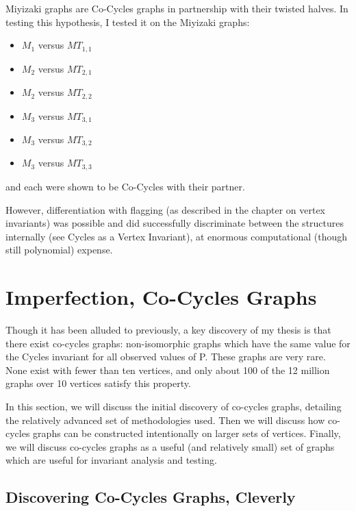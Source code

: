 Miyizaki graphs are Co-Cycles graphs in partnership with their twisted halves.
In testing this hypothesis, I tested it on the Miyizaki graphs:
\begin{itemize}
\item{$M_1$ versus $MT_{1,1}$}
\item{$M_2$ versus $MT_{2,1}$}
\item{$M_2$ versus $MT_{2,2}$}
\item{$M_3$ versus $MT_{3,1}$}
\item{$M_3$ versus $MT_{3,2}$}
\item{$M_3$ versus $MT_{3,3}$}
\end{itemize}
and each were shown to be Co-Cycles with their partner.

However, differentiation with flagging (as described in the chapter on vertex invariants) was possible and did successfully discriminate between the structures internally (see Cycles as a Vertex Invariant), at enormous computational (though still polynomial) expense.

\section{Imperfection, Co-Cycles Graphs}

Though it has been alluded to previously, a key discovery of my thesis is that there exist co-cycles graphs: non-isomorphic graphs which have the same value for the Cycles invariant for all observed values of P.
These graphs are very rare.
None exist with fewer than ten vertices, and only about 100 of the 12 million graphs over 10 vertices satisfy this property.

In this section, we will discuss the initial discovery of co-cycles graphs, detailing the relatively advanced set of methodologies used.
Then we will discuss how co-cycles graphs can be constructed intentionally on larger sets of vertices.
Finally, we will discuss co-cycles graphs as a useful (and relatively small) set of graphs which are useful for invariant analysis and testing.

\subsection{Discovering Co-Cycles Graphs, Cleverly}

